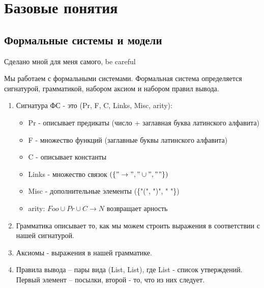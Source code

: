 \section{Базовые понятия}
\label{sec-1}
\subsection{Формальные системы и модели}
\label{sec-1-1}
Сделано мной для меня самого, be careful

Мы работаем с формальными системами.
Формальная система определяется сигнатурой, грамматикой,
набором аксиом и набором правил вывода.
\begin{enumerate}
\item Сигнатура ФС - это (Pr, F, C, Links, Misc, arity):
\begin{itemize}
\item Pr - описывает предикаты (число + заглавная буква латинского алфавита)
\item F - множество функций (заглавные буквы латинского алфавита)
\item C - описывает константы
\item Links - множество связок $(\lbrace"\to", "\cup", " "\rbrace)$
\item Misc - дополнительные элементы (\{"(", ")", " "\})
\item arity: $Foo ∪ Pr ∪ C \to N$ возвращает арность
\end{itemize}
\item Грамматика описывает то, как мы можем строить выражения
в соответствии с нашей сигнатурой.
\item Аксиомы - выражения в нашей грамматике.
\item Правила вывода – пары вида (List, List), где List -
список утверждений. Первый элемент – посылки, второй -
то, что из них следует.
\end{enumerate}

